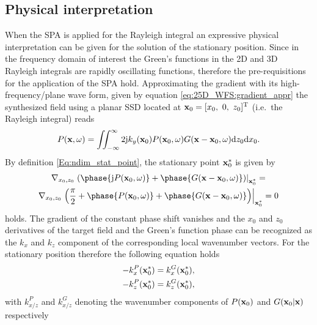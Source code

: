 \subsection{Physical interpretation}
When the SPA is applied for the Rayleigh integral an expressive physical interpretation can be given for the solution of the stationary position.
Since in the frequency domain of interest the Green's functions in the 2D and 3D Rayleigh integrals are rapidly oscillating functions, therefore the pre-requisitions for the application of the SPA hold.
Approximating the gradient with its high-frequency/plane wave form, given by equation \eqref{eq:25D_WFS:gradient_appr} 
the synthesized field using a planar SSD located at $\mathbf{x}_0 = [x_0,\ 0,\ z_0]^{\mathrm{T}}$ (i.e.\ the Rayleigh integral) reads
\begin{equation}
P(\mathbf{x},\omega) = \iint_{-\infty}^{\infty} 2 \mathrm{j} k_y(\mathbf{x}_0) P(\mathbf{x}_0,\omega) G(\mathbf{x}-\mathbf{x}_0,\omega) \mathrm{d} z_0 \mathrm{d} x_0.
\end{equation}
By definition \eqref{Eq:ndim_stat_point}, the stationary point $\mathbf{x}_0^*$ is given by
\begin{multline}
\nabla_{x_0,z_0} \left.
\left( \phase{ \ti P(\vxo,\omega)} + \phase{ G(\vx-\vxo,\omega)} \right) \right|_{\vxo^*} =
\\
\nabla_{x_0,z_0} \left.
\left( \frac{\pi}{2}+\phase{ P(\vxo,\omega)} + \phase{ G(\vx-\vxo,\omega)} \right) \right|_{\vxo^*} = 0
\end{multline}
holds.
The gradient of the constant phase shift vanishes and the $x_0$ and $z_0$ derivatives of the target field and the Green's function phase can be recognized as the $k_x$ and $k_z$ component of the corresponding local wavenumber vectors.
For the stationary position therefore the following equation holds
\begin{align}
\begin{split}
-k_{x}^P(\mathbf{x}_0^*) &= k_{x}^G(\mathbf{x}_0^*), \\
-k_{z}^P(\mathbf{x}_0^*) &= k_{z}^G(\mathbf{x}_0^*),
\end{split}
\end{align}
with $k_{x/z}^{P}$ and $k_{x/z}^{G}$ denoting the wavenumber components of $P(\mathbf{x}_0)$ and $G(\mathbf{x}_0|\mathbf{x})$ respectively
%
